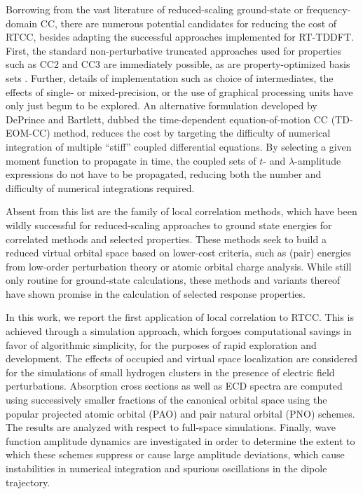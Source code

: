 Borrowing from the vast literature of reduced-scaling ground-state or
frequency-domain CC, there are numerous potential candidates for reducing the
cost of RTCC, besides adapting the successful approaches implemented for RT-TDDFT.
First, the standard non-perturbative truncated approaches used
for properties such as CC2\cite{Christiansen1995} and CC3\cite{Koch1997}
are immediately possible, as are property-optimized basis sets
\cite{Wolinski1990,Sadlej1977,Roos1985,Sadlej1991a,Benkova2005,Baranowska2010,Baranowska2013,Aharon2020a,Howard2018}.
Further, details of implementation such as choice of intermediates, the
effects of single- or mixed-precision, or the use of graphical processing
units have only just begun to be explored. \cite{Wang2022} 
An alternative formulation developed by DePrince and Bartlett, 
dubbed the time-dependent equation-of-motion CC (TD-EOM-CC)
\cite{Nascimento2016,Nascimento2017,Nascimento2019,Park2019,Park2021b}
method, reduces the cost by targeting the difficulty of
numerical integration of multiple ``stiff'' coupled differential
equations. By selecting a given moment function to propagate in time,
the coupled sets of $t$- and $\lambda$-amplitude expressions do
not have to be propagated, reducing both the number and difficulty
of numerical integrations required. 

Absent from this list are the family of local correlation methods,\cite{Werner2006}
which have been wildly successful for reduced-scaling approaches to
ground state energies for correlated methods and selected properties.
\cite{Crawford2019,Aharon2020a,DCunha2021,Kodrycka2022} These methods seek to
build a reduced virtual orbital space based on lower-cost criteria, such
as (pair) energies from low-order perturbation theory or atomic orbital
charge analysis. While still only routine for ground-state calculations,
these methods and variants thereof have shown promise in the calculation
of selected response properties.

In this work, we report the first application of local correlation to 
RTCC. This is achieved through a simulation approach\cite{Hampel1996}, 
which forgoes computational savings in favor of algorithmic simplicity, 
for the purposes of rapid exploration and development. 
The effects of occupied and virtual space localization are considered for the simulations of small
hydrogen clusters in the presence of electric field perturbations. Absorption cross sections as
well as ECD spectra are computed using successively smaller fractions of the canonical
orbital space using the popular 
projected atomic orbital (PAO)
\cite{Pulay1983,Saebo1985,Saebo1986,Saebo1993}
and pair natural orbital (PNO)
\cite{Neese2009,Neese2009a}
schemes. The results are analyzed with respect to full-space simulations. 
Finally, wave function amplitude dynamics are investigated
in order to determine the extent to which these schemes suppress or cause large amplitude 
deviations, which cause instabilities in numerical integration and spurious oscillations in the 
dipole trajectory.
